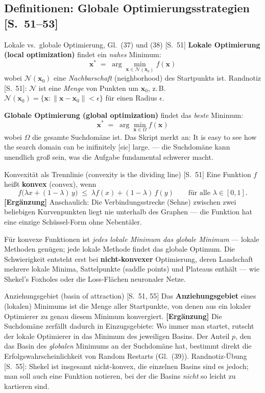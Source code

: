 \subsection{Definitionen: Globale Optimierungsstrategien [S.~51--53]}

\begin{defbox}{Lokale vs.\ globale Optimierung, Gl.~(37) und (38) [S.~51]}
\textbf{Lokale Optimierung (local optimization)} findet ein \emph{nahes} Minimum:
\[
  \mathbf{x}^{*} \;=\; \arg\min_{\mathbf{x} \in \mathcal{N}(\mathbf{x}_0)} f(\mathbf{x}) \tag{37}
\]
wobei $\mathcal{N}(\mathbf{x}_0)$ eine \emph{Nachbarschaft} (neighborhood) des
Startpunkts ist. Randnotiz [S.~51]: $\mathcal{N}$ ist eine \emph{Menge} von Punkten um
$\mathbf{x}_0$, z.\,B.\ $\mathcal{N}(\mathbf{x}_0) = \{\mathbf{x} :
\|\mathbf{x} - \mathbf{x}_0\| < \epsilon\}$ für einen Radius $\epsilon$.

\medskip
\textbf{Globale Optimierung (global optimization)} findet das \emph{beste} Minimum:
\[
  \mathbf{x}^{*} \;=\; \arg\min_{\mathbf{x} \in \Omega} f(\mathbf{x}) \tag{38}
\]
wobei $\Omega$ die gesamte Suchdomäne ist. Das Skript merkt an: \glqq It is easy to see
how the search domain can be inifinitely [sic] large.\grqq{} --- die Suchdomäne kann
unendlich gro{\ss} sein, was die Aufgabe fundamental schwerer macht.
\end{defbox}

\begin{defbox}{Konvexität als Trennlinie (convexity is the dividing line) [S.~51]}
Eine Funktion $f$ hei{\ss}t \textbf{konvex} (convex), wenn
\[
  f\bigl(\lambda x + (1-\lambda)\,y\bigr) \;\le\; \lambda f(x) + (1-\lambda)\,f(y)
  \qquad \text{für alle } \lambda \in [0,1].
\]
\textbf{[Ergänzung]} Anschaulich: Die Verbindungsstrecke (Sehne) zwischen zwei beliebigen
Kurvenpunkten liegt nie unterhalb des Graphen --- die Funktion hat eine einzige
\glqq Schüssel\grqq-Form ohne Nebentäler.

Für konvexe Funktionen ist \emph{jedes lokale Minimum das globale Minimum} ---
lokale Methoden genügen; jede lokale Methode findet das globale Optimum. Die
Schwierigkeit entsteht erst bei \textbf{nicht-konvexer} Optimierung, deren Landschaft
mehrere lokale Minima, Sattelpunkte (saddle points) und Plateaus enthält ---
wie Shekel's Foxholes oder die Loss-Flächen neuronaler Netze.
\end{defbox}

\begin{defbox}{Anziehungsgebiet (basin of attraction) [S.~51, 55]}
Das \textbf{Anziehungsgebiet} eines (lokalen) Minimums ist die Menge aller Startpunkte,
von denen aus ein lokaler Optimierer zu genau diesem Minimum konvergiert.
\textbf{[Ergänzung]} Die Suchdomäne zerfällt dadurch in \glqq Einzugsgebiete\grqq:
Wo immer man startet, rutscht der lokale Optimierer in das Minimum des jeweiligen
Basins. Der Anteil $p$, den das Basin des \emph{globalen} Minimums an der Suchdomäne
hat, bestimmt direkt die Erfolgswahrscheinlichkeit von Random Restarts (Gl.~(39)).
Randnotiz-Übung [S.~55]: Shekel ist insgesamt nicht-konvex, die einzelnen Basins sind
es jedoch; man soll auch eine Funktion notieren, bei der die Basins \emph{nicht} so
leicht zu kartieren sind.
\end{defbox}

